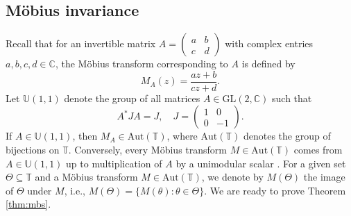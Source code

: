 \documentclass[reqno,a4paper,11pt]{amsart}
\numberwithin{equation}{section}
\def\T{{\mathbb T}}
\def\C{{\mathbb C}}
\def\U{{\mathbb U}}
\newcommand\1{\mathds{1}}
\begin{document}
\subsection{Möbius invariance}

Recall that for an invertible matrix $A = \begin{pmatrix}
    a & b \\ c & d
\end{pmatrix}$ with complex entries $a,b,c,d \in \C$, the Möbius transform corresponding to $A$ is defined by
$$
M_A(z) = \frac{az+b}{cz+d}.
$$
Let $\U(1,1)$ denote the group of all matrices $A \in \mathrm{GL}(2,\C)$ such that
$$
A^*JA = J, \quad J = \begin{pmatrix}
    1 & 0 \\ 0 & -1
\end{pmatrix}.
$$
If $A \in \U(1,1)$, then $M_A\in\mathrm{Aut}(\T)$, where $\mathrm{Aut}(\T)$ denotes the group of bijections on $\T$. Conversely, every Möbius transform $M\in \mathrm{Aut}(\T)$ comes from $A \in \U(1,1)$ up to multiplication of $A$ by a unimodular scalar \cite[Chapter 10.4]{simon2005orthogonal}.
For a given set $\Theta \subseteq \T$ and a Möbius transform $M\in \mathrm{Aut}(\T)$, we denote by $M(\Theta)$ the image of $\Theta$ under $M$, i.e.,
$
M(\Theta) = \{ M(\theta) : \theta \in \Theta \}.
$
We are ready to prove Theorem \ref{thm:mbs}.
\end{document}
